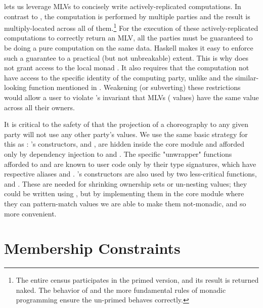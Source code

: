  lets us leverage MLVs to concisely write actively-replicated computations.
In contrast to , the computation is performed by multiple parties
and the result is multiply-located across all of them.\footnote{
    The entire census participates in the primed version, and its result is returned naked.
    The behavior of  and the more fundamental rules of monadic programming
    ensure the un-primed  behaves correctly.
}
For the execution of these actively-replicated computations to correctly return an MLV,
all the parties must be guaranteed to be doing a pure computation on the same data.
Haskell makes it easy to enforce such a guarantee to a practical (but not unbreakable) extent.
This is why  does not grant access to the local monad .
It also requires that the computation not have access to the specific identity of the computing party,
unlike  and the similar-looking function  mentioned in .
Weakening (or subverting) these restrictions would allow a user to violate \MultiChor's invariant that MLVs ( values)
have the same value across all their owners.

It is critical to the safety of \MultiChor that the projection of a choreography to any given party will not use
any other party's  values.
We use the same basic strategy for this as \HasChor:
's constructors,  and , are hidden inside the core module
and afforded only by dependency injection to  and .
The specific "unwrapper" functions afforded to  and 
are known to user code only by their type signatures, which have respective aliases  and .
's constructors are also used by two less-critical functions,  and .
These are needed for shrinking ownership sets or un-nesting  values;
they could be written using ,
but by implementing them in the core module where they can pattern-match  values we are able to make them not-monadic,
and so more convenient.


\section{Membership Constraints}
\label{sec:membership}

